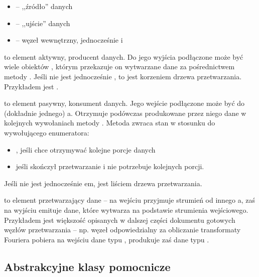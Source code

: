 \begin{itemize}

  \item {} -- ,,źródło'' danych

  \item {} -- ,,ujście'' danych

  \item {} -- węzeł wewnętrzny, jednocześnie  i 

\end{itemize}

 to element aktywny, producent danych. Do jego wyjścia podłączone może być wiele
obiektów , którym przekazuje on wytwarzane dane za pośrednictwem metody .
Jeśli  nie jest jednocześnie , to jest korzeniem drzewa
przetwarzania.  Przykładem  jest .

 to element pasywny, konsument danych. Jego wejście podłączone może być do (dokładnie
jednego) a. Otrzymuje podówczas produkowane przez niego dane w kolejnych
wywołaniach metody . Metoda  zwraca stan  w stosunku do
wywołującego  enumeratora:

\begin{itemize}

  \item {}, jeśli  chce otrzymywać kolejne porcje danych

  \item {} jeśli  skończył przetwarzanie i nie potrzebuje kolejnych
    porcji.

\end{itemize}

Jeśli  nie jest jednocześnie em, jest liściem drzewa przetwarzania.

 to element przetwarzający dane -- na wejściu przyjmuje strumień od innego
a, zaś na wyjściu emituje dane, które wytwarza na podstawie strumienia wejściowego.
Przykładem  jest większość opisanych w dalszej części dokumentu gotowych węzłów
przetwarzania -- np. węzeł odpowiedzialny za obliczanie transformaty Fouriera pobiera na wejściu
dane typu , produkuje zaś dane typu .


\subsection{Abstrakcyjne klasy pomocnicze}

